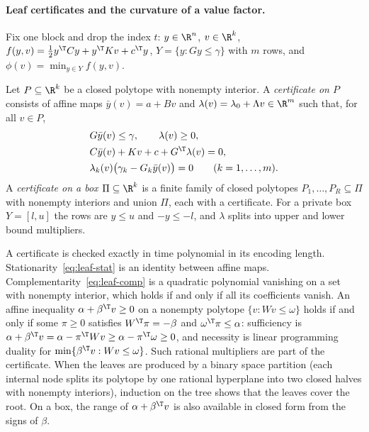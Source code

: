 \paragraph{Leaf certificates and the curvature of a value factor.}

Fix one block and drop the index $t$: $y\in\R^n$, $v\in\R^k$,
$f(y,v)=\frac12y^{\T}Cy+y^{\T}Kv+c^{\T}y$,
$Y=\{y:Gy\le\gamma\}$ with $m$ rows, and $\phi(v)=\min_{y\in Y}f(y,v)$.

\begin{definition}\label{def:leaf}
Let $P\subseteq\R^k$ be a closed polytope with nonempty interior. A
\emph{certificate on $P$} consists of affine maps $\bar y(v)=a+Bv$ and
$\lambda(v)=\lambda_0+\Lambda v\in\R^m$ such that, for all $v\in P$,
\begin{align}
&G\bar y(v)\le\gamma,\qquad \lambda(v)\ge0,\label{eq:leaf-feas}\\
&C\bar y(v)+Kv+c+G^{\T}\lambda(v)=0,\label{eq:leaf-stat}\\
&\lambda_k(v)\bigl(\gamma_k-G_k\bar y(v)\bigr)=0\qquad(k=1,\ldots,m).\label{eq:leaf-comp}
\end{align}
A \emph{certificate on a box $\Pi\subseteq\R^k$} is a finite family of closed
polytopes $P_1,\ldots,P_R\subseteq\Pi$ with nonempty interiors and union $\Pi$,
each with a certificate. For a private box $Y=[l,u]$ the rows are
$y\le u$ and $-y\le-l$, and $\lambda$ splits into upper and lower bound
multipliers.
\end{definition}

A certificate is checked exactly in time polynomial in its encoding length.
Stationarity~\eqref{eq:leaf-stat} is an identity between affine maps.
Complementarity~\eqref{eq:leaf-comp} is a quadratic polynomial vanishing on a
set with nonempty interior, which holds if and only if all its coefficients
vanish. An affine inequality $\alpha+\beta^{\T}v\ge0$ on a nonempty
polytope $\{v:Wv\le\omega\}$ holds if and only if some $\pi\ge0$ satisfies
$W^{\T}\pi=-\beta$ and $\omega^{\T}\pi\le\alpha$: sufficiency is
$\alpha+\beta^{\T}v=\alpha-\pi^{\T}Wv\ge\alpha-\pi^{\T}\omega\ge0$,
and necessity is linear programming duality for
$\min\{\beta^{\T}v:Wv\le\omega\}$. Such rational multipliers are part of
the certificate. When the leaves are produced by a binary space partition
(each internal node splits its polytope by one rational hyperplane into two
closed halves with nonempty interiors), induction on the tree shows that the
leaves cover the root. On a box, the range of $\alpha+\beta^{\T}v$ is
also available in closed form from the signs of $\beta$.


